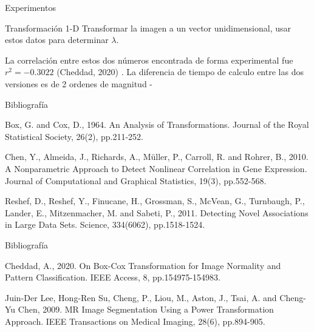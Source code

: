 \documentclass{beamer}
\begin{document}
\begin{frame}{Experimentos}
    \pause
    \begin{block}{Transformación 1-D}
        Transformar la imagen a un vector unidimensional, usar estos datos para determinar $\lambda$.
    \end{block}
    
    La correlación entre estos dos números encontrada de forma experimental fue $r^2=-0.3022$ (Cheddad, 2020) \cite{cheddad2020}. La diferencia de tiempo de calculo entre las dos versiones es de 2 ordenes de magnitud
    -
\end{frame}


\begin{frame}{Bibliografía}
    \begin{thebibliography}{9}
    Box, G. and Cox, D., 1964. An Analysis of Transformations. Journal of the Royal Statistical Society, 26(2), pp.211-252.
    
    Chen, Y., Almeida, J., Richards, A., Müller, P., Carroll, R. and Rohrer, B., 2010. A Nonparametric Approach to Detect Nonlinear Correlation in Gene Expression. Journal of Computational and Graphical Statistics, 19(3), pp.552-568.
    
    Reshef, D., Reshef, Y., Finucane, H., Grossman, S., McVean, G., Turnbaugh, P., Lander, E., Mitzenmacher, M. and Sabeti, P., 2011. Detecting Novel Associations in Large Data Sets. Science, 334(6062), pp.1518-1524.
    
    \end{thebibliography}
\end{frame}

\begin{frame}{Bibliografía}
    \begin{thebibliography}{9}
    Cheddad, A., 2020. On Box-Cox Transformation for Image Normality and Pattern Classification. IEEE Access, 8, pp.154975-154983.
    
    Juin-Der Lee, Hong-Ren Su, Cheng, P., Liou, M., Aston, J., Tsai, A. and Cheng-Yu Chen, 2009. MR Image Segmentation Using a Power Transformation Approach. IEEE Transactions on Medical Imaging, 28(6), pp.894-905.
    
    \end{thebibliography}
\end{frame}
\end{document}
